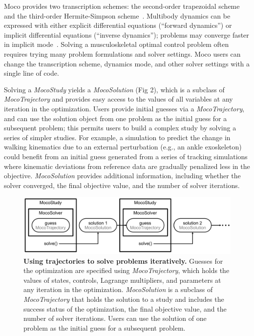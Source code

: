 \documentclass[10pt,letterpaper]{article}
\begin{document}
Moco provides two transcription schemes: the second-order trapezoidal scheme and the third-order Hermite-Simpson scheme~\cite{Betts:2010}. Multibody dynamics can be expressed with either explicit differential equations (“forward dynamics”) or implicit differential equations (“inverse dynamics”); problems may converge faster in implicit mode~\cite{vandenBogert:2011fv}. Solving a musculoskeletal optimal control problem often requires trying many problem formulations and solver settings. Moco users can change the transcription scheme, dynamics mode, and other solver settings with a single line of code.

Solving a \textit{MocoStudy} yields a \textit{MocoSolution} (Fig 2), which is a subclass of \textit{MocoTrajectory} and provides easy access to the values of all variables at any iteration in the optimization. Users provide initial guesses via a \textit{MocoTrajectory}, and can use the solution object from one problem as the initial guess for a subsequent problem; this permits users to build a complex study by solving a series of simpler studies. For example, a simulation to predict the change in walking kinematics due to an external perturbation (e.g., an ankle exoskeleton) could benefit from an initial guess generated from a series of tracking simulations where kinematic deviations from reference data are gradually penalized less in the objective.  \textit{MocoSolution} provides additional information, including whether the solver converged, the final objective value, and the number of solver iterations.

\begin{figure}[!h]
    \centering
    \includegraphics{../figures/MocoSolverDiagram.png}
    \caption{{\bf Using trajectories to solve problems iteratively.}
    Guesses for the optimization are specified using \textit{MocoTrajectory}, which holds the values of states, controls, Lagrange multipliers, and parameters at any iteration in the optimization. \textit{MocoSolution} is a subclass of \textit{MocoTrajectory} that holds the solution to a study and includes the success status of the optimization, the final objective value, and the number of solver iterations. Users can use the solution of one problem as the initial guess for a subsequent problem.
    }
    \label{mocosolverdiagram}
\end{figure}
\end{document}
